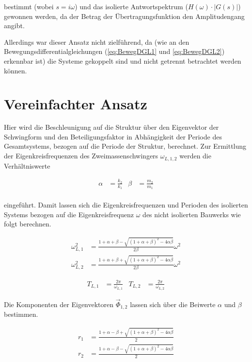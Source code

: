 bestimmt (wobei $s = i \omega$) und das isolierte Antwortspektrum ($H(\omega) \cdot |G(s)|$) gewonnen werden, da der Betrag der Übertragungsfunktion den Amplitudengang angibt.

Allerdings war dieser Ansatz nicht zielführend, da (wie an den Bewegungsdifferentialgleichungen (\cref{eq:BewegDGL1} und \cref{eq:BewegDGL2}) erkennbar ist) die Systeme gekoppelt sind und nicht getrennt betrachtet werden können.

\section{Vereinfachter Ansatz}
\label{sec:ansatzvereinfacht}

Hier wird die Beschleunigung auf die Struktur über den Eigenvektor der Schwingform und den Beteiligungsfaktor in Abhängigkeit der Periode des Gesamtsystems, bezogen auf die Periode der Struktur, berechnet.
Zur Ermittlung der Eigenkreisfrequenzen des Zweimassenschwingers $\omega_{L,1,2}$ werden die Verhältniswerte

\begin{align}
\alpha &= \frac{k_2}{k_1} & \beta  &= \frac{m_2}{m_1} \\
\end{align}

eingeführt. Damit lassen sich die Eigenkreisfrequenzen und Perioden des isolierten Systems bezogen auf die Eigenkreisfrequenz $\omega$ des nicht isolierten Bauwerks wie folgt berechnen. \cite{Pocanschi} \cite{Isemann}

\begin{align}
\omega_{L,1}^2 &= \frac{1 + \alpha + \beta - \sqrt{(1 + \alpha + \beta)^2 - 4 \alpha \beta}}{2 \beta} \omega^2\\
\omega_{L,2}^2 &= \frac{1 + \alpha + \beta + \sqrt{(1 + \alpha + \beta)^2 - 4 \alpha \beta}}{2 \beta} \omega^2
\end{align}

\begin{align}
T_{L,1} &= \frac{2 \pi}{\omega_{L,1}} & T_{L,2} &= \frac{2 \pi}{\omega_{L,2}}
\end{align}

Die Komponenten der Eigenvektoren $\vec{\Phi}_{1,2}$ lassen sich über die Beiwerte $\alpha$ und $\beta$ bestimmen.

\begin{align}
r_1 &= \frac{1 + \alpha - \beta + \sqrt{(1 + \alpha + \beta)^2 - 4 \alpha \beta}}{2}\\
r_2 &= \frac{1 + \alpha - \beta - \sqrt{(1 + \alpha + \beta)^2 - 4 \alpha \beta}}{2}
\end{align}

